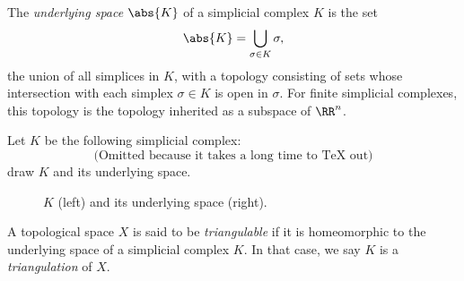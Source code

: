 \begin{definition}
  The \emph{underlying space} $\abs{K}$ of a simplicial complex $K$ is the set
  \[
    \abs{K} = \bigcup_{\sigma \in K} \sigma,
  \]
  the union of all simplices in $K$, with a topology consisting of sets whose
  intersection with each simplex $\sigma \in K$ is open in $\sigma$. For finite
  simplicial complexes, this topology is the topology inherited as a subspace of
  $\RR^n$.
\end{definition}
\begin{problem}[15.14]
  Let $K$ be the following simplicial complex:
  \[
    \text{(Omitted because it takes a long time to TeX out)}
  \]
  draw $K$ and its underlying space.
\end{problem}
\begin{solution}
  \begin{figure}[H]
    \centering
    \begin{minipage}{.49\linewidth}
      \centering
    \end{minipage}
    \begin{minipage}{.49\linewidth}
      \centering
    \end{minipage}
    \caption{$K$ (left) and its underlying space (right).}
  \end{figure}
\end{solution}
\begin{definition}[Triangulable]
  A topological space $X$ is said to be \emph{triangulable} if it is
  homeomorphic to the underlying space of a simplicial complex $K$. In that
  case, we say $K$ is a \emph{triangulation} of $X$.
\end{definition}
